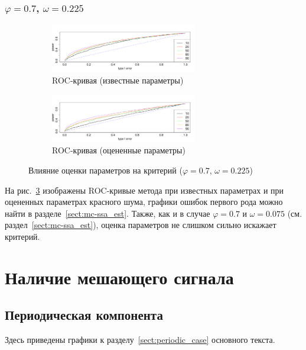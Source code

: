 \documentclass[specialist,
substylefile = spbu_report.rtx,
subf,href,colorlinks=true, 12pt]{disser}
\theoremstyle{definition}
\begin{document}
\subsubsection{$\varphi=0.7$, $\omega=0.225$}
\begin{figure}[h!]
	\captionsetup[subfigure]{justification=Centering}
	\begin{subfigure}[t]{\textwidth}
		\centering
		\includegraphics[width=0.7\textwidth]{img/roc_phi7_omega0225.pdf}
		\caption{ROC-кривая (известные параметры)}
		\label{fig:roc_phi7_omega0225}
	\end{subfigure}
	\begin{subfigure}[t]{\textwidth}
		\centering
		\includegraphics[width=0.7\textwidth]{img/roc_phi7est_omega0225.pdf}
		\caption{ROC-кривая (оцененные параметры)}
		\label{fig:roc_phi7est_omega0225}
	\end{subfigure}
	\caption{Влияние оценки параметров на критерий ($\varphi=0.7$, $\omega=0.225$)}
	\label{fig:phi7est_omega0225}
\end{figure}

На рис.~\ref{fig:phi7est_omega0225} изображены ROC-кривые метода при известных параметрах и при оцененных параметрах красного шума, графики ошибок первого рода можно найти в разделе~\ref{sect:mc-ssa_est}. Также, как и в случае $\varphi=0.7$ и $\omega=0.075$ (см. раздел~\ref{sect:mc-ssa_est}), оценка параметров не слишком сильно искажает критерий.

\section{Наличие мешающего сигнала}

\subsection{Периодическая компонента}\label{appendix:mc-ssa_nuisance_sin_graphs}
Здесь приведены графики к разделу~\ref{sect:periodic_case} основного текста.
\end{document}
